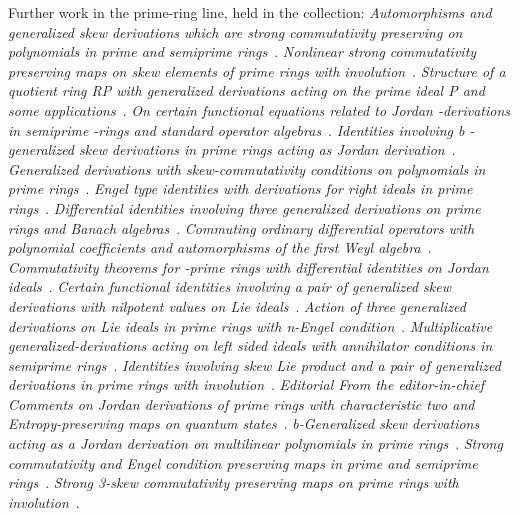 Further work in the prime-ring line, held in the collection:
\noindent\emph{Automorphisms and generalized skew derivations which are strong
commutativity preserving on polynomials in prime and semiprime
rings}~\cite{LibAutomorphismsAndGeneralizedSkew2016}. \noindent\emph{Nonlinear
strong commutativity preserving maps on skew elements of prime rings with
involution}~\cite{LibNonlinearStrongCommutativityPreser2012}.
\noindent\emph{Structure of a quotient ring RP with generalized derivations
acting on the prime ideal P and some
applications}~\cite{LibStructureOfAQuotient2021}. \noindent\emph{On certain
functional equations related to Jordan -derivations in semiprime -rings and
standard operator algebras}~\cite{LibOnCertainFunctionalEquations2018}.
\noindent\emph{Identities involving b -generalized skew derivations in prime
rings acting as Jordan
derivation}~\cite{LibIdentitiesInvolvingBGeneralized2024}.
\noindent\emph{Generalized derivations with skew-commutativity conditions on
polynomials in prime rings}~\cite{LibGeneralizedDerivationsWithSkew2019}.
\noindent\emph{Engel type identities with derivations for right ideals in
prime rings}~\cite{LibEngelTypeIdentitiesWith2006}.
\noindent\emph{Differential identities involving three generalized derivations
on prime rings and Banach
algebras}~\cite{LibDifferentialIdentitiesInvolvingThr}.
\noindent\emph{Commuting ordinary differential operators with polynomial
coefficients and automorphisms of the first Weyl
algebra}~\cite{LibCommutingOrdinaryDifferentialOpera2016}.
\noindent\emph{Commutativity theorems for -prime rings with differential
identities on Jordan ideals}~\cite{LibCommutativityTheoremsForPrime2012}.
\noindent\emph{Certain functional identities involving a pair of generalized
skew derivations with nilpotent values on Lie
ideals}~\cite{LibCertainFunctionalIdentitiesInvolvi2023}.
\noindent\emph{Action of three generalized derivations on Lie ideals in prime
rings with n-Engel condition}~\cite{LibActionOfThreeGeneralized2026}.
\noindent\emph{Multiplicative generalized-derivations acting on left sided
ideals with annihilator conditions in semiprime
rings}~\cite{LibMultiplicativeGeneralizedDerivatio2024}.
\noindent\emph{Identities involving skew Lie product and a pair of generalized
derivations in prime rings with
involution}~\cite{LibIdentitiesInvolvingSkewLie2021}. \noindent\emph{Editorial
From the editor-in-chief Comments on Jordan derivations of prime rings with
characteristic two and Entropy-preserving maps on quantum
states}~\cite{LibEditorialFromTheEditor2017}. \noindent\emph{b-Generalized
skew derivations acting as a Jordan derivation on multilinear polynomials in
prime rings}~\cite{LibBGeneralizedSkewDerivations2023}. \noindent\emph{Strong
commutativity and Engel condition preserving maps in prime and semiprime
rings}~\cite{LibStrongCommutativityAndEngel2012}. \noindent\emph{Strong 3-skew
commutativity preserving maps on prime rings with
involution}~\cite{LibStrongSkewCommutativityPreserving2023}.
